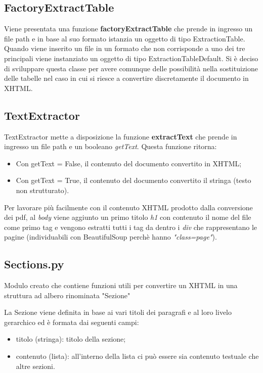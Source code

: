 \subsection{FactoryExtractTable}
Viene presentata una funzione \textbf{factoryExtractTable} che prende in ingresso un file path e in base al suo formato istanzia un oggetto di tipo ExtractionTable.
Quando viene inserito un file in un formato che non corrisponde a uno dei tre principali viene instanziato un oggetto di tipo ExtractionTableDefault.
Si è deciso di sviluppare questa classe per avere comunque delle possibilità nella sostituizione delle tabelle nel caso in cui si riesce a convertire discretamente il documento in XHTML.

\subsection{TextExtractor}
TextExtractor mette a disposizione la funzione \textbf{extractText} che prende in ingresso un file path e un booleano \emph{getText}.
Questa funzione ritorna:
\begin{itemize}
    \item Con getText = False, il contenuto del documento convertito in XHTML;
    \item Con getText = True, il contenuto del documento convertito il stringa (testo non strutturato). 
\end{itemize}

Per lavorare più facilmente con il contenuto XHTML prodotto dalla conversione dei pdf, al \emph{body} viene aggiunto un primo titolo \emph{h1} con contenuto il nome del file come primo tag e vengono estratti tutti i tag da dentro i \emph{div} che rappresentano le pagine (individuabili con BeautifulSoup perchè hanno \emph{"class=page"}).

\subsection{Sections.py}
Modulo creato che contiene funzioni utili per convertire un XHTML in una struttura ad albero rinominata "Sezione"

La Sezione viene definita in base ai vari titoli dei paragrafi e al loro livelo gerarchico ed è formata dai seguenti campi:
\begin{itemize}
    \item titolo (stringa): titolo della sezione;
    \item contenuto (lista): all'interno della lista ci può essere sia contenuto testuale che altre sezioni. 
\end{itemize}

